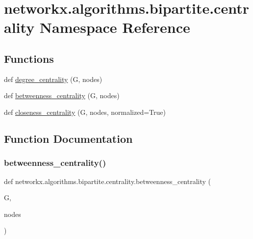 \hypertarget{namespacenetworkx_1_1algorithms_1_1bipartite_1_1centrality}{}\section{networkx.\+algorithms.\+bipartite.\+centrality Namespace Reference}
\label{namespacenetworkx_1_1algorithms_1_1bipartite_1_1centrality}
\subsection*{Functions}
\begin{DoxyCompactItemize}
\item 
def \hyperlink{namespacenetworkx_1_1algorithms_1_1bipartite_1_1centrality_a98a64581dd9879f03a3c698f360bab2d}{degree\+\_\+centrality} (G, nodes)
\item 
def \hyperlink{namespacenetworkx_1_1algorithms_1_1bipartite_1_1centrality_a709a14c14c168b920c5c80569364ff9f}{betweenness\+\_\+centrality} (G, nodes)
\item 
def \hyperlink{namespacenetworkx_1_1algorithms_1_1bipartite_1_1centrality_af8d12405f1ad5f68f8d32f71e32fea4a}{closeness\+\_\+centrality} (G, nodes, normalized=True)
\end{DoxyCompactItemize}


\subsection{Function Documentation}
\mbox{\label{namespacenetworkx_1_1algorithms_1_1bipartite_1_1centrality_a709a14c14c168b920c5c80569364ff9f}} 
\subsubsection{\texorpdfstring{betweenness\+\_\+centrality()}{betweenness\_centrality()}}
{\footnotesize\ttfamily def networkx.\+algorithms.\+bipartite.\+centrality.\+betweenness\+\_\+centrality (\begin{DoxyParamCaption}\item[{}]{G,  }\item[{}]{nodes }\end{DoxyParamCaption})}

